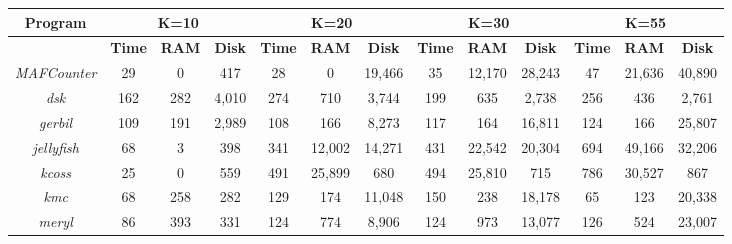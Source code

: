 \documentclass{article}
\begin{document}
\noindent
\setlength{\tabcolsep}{1pt}
\scriptsize
\begin{adjustbox}{max width=\textwidth, max totalheight=\textheight, keepaspectratio}
\begin{tabular}{@{}|c|c|c|c|c|c|c|c|c|c|c|c|c|}
\hline
\textbf{Program} & \multicolumn{3}{c|}{\textbf{K=10}} & \multicolumn{3}{c|}{\textbf{K=20}} & \multicolumn{3}{c|}{\textbf{K=30}} & \multicolumn{3}{c|}{\textbf{K=55}} \\
\hline
 & \textbf{\hspace{2pt}Time\hspace{2pt}} & \textbf{\hspace{2pt}RAM\hspace{2pt}} & \textbf{\hspace{2pt}Disk\hspace{2pt}} & \textbf{\hspace{2pt}Time\hspace{2pt}} & \textbf{\hspace{2pt}RAM\hspace{2pt}} & \textbf{\hspace{2pt}Disk\hspace{2pt}} & \textbf{\hspace{2pt}Time\hspace{2pt}} & \textbf{\hspace{2pt}RAM\hspace{2pt}} & \textbf{\hspace{2pt}Disk\hspace{2pt}} & \textbf{\hspace{2pt}Time\hspace{2pt}} & \textbf{\hspace{2pt}RAM\hspace{2pt}} & \textbf{\hspace{2pt}Disk\hspace{2pt}} \\
\hline
\textit{MAFCounter} & 29 & 0 & 417 & 28 & 0 & 19,466 & 35 & 12,170 & 28,243 & 47 & 21,636 & 40,890 \\
\hline
\textit{dsk} & 162 & 282 & 4,010 & 274 & 710 & 3,744 & 199 & 635 & 2,738 & 256 & 436 & 2,761 \\
\hline
\textit{gerbil} & 109 & 191 & 2,989 & 108 & 166 & 8,273 & 117 & 164 & 16,811 & 124 & 166 & 25,807 \\
\hline
\textit{jellyfish} & 68 & 3 & 398 & 341 & 12,002 & 14,271 & 431 & 22,542 & 20,304 & 694 & 49,166 & 32,206 \\
\hline
\textit{kcoss} & 25 & 0 & 559 & 491 & 25,899 & 680 & 494 & 25,810 & 715 & 786 & 30,527 & 867 \\
\hline
\textit{kmc} & 68 & 258 & 282 & 129 & 174 & 11,048 & 150 & 238 & 18,178 & 65 & 123 & 20,338 \\
\hline
\textit{meryl} & 86 & 393 & 331 & 124 & 774 & 8,906 & 124 & 973 & 13,077 & 126 & 524 & 23,007 \\
\hline
\end{tabular}
\end{adjustbox}
\end{document}
